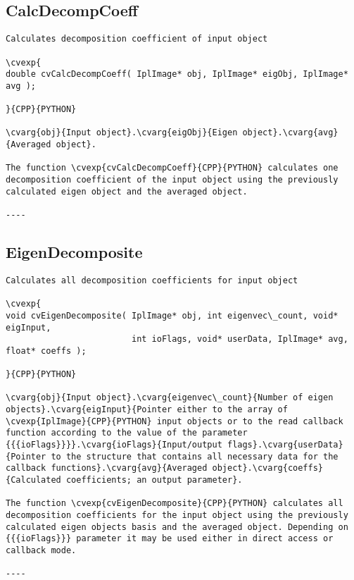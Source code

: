 \subsection{CalcDecompCoeff}
\begin{verbatim}
Calculates decomposition coefficient of input object

\cvexp{
double cvCalcDecompCoeff( IplImage* obj, IplImage* eigObj, IplImage* avg );

}{CPP}{PYTHON}

\cvarg{obj}{Input object}.\cvarg{eigObj}{Eigen object}.\cvarg{avg}{Averaged object}.

The function \cvexp{cvCalcDecompCoeff}{CPP}{PYTHON} calculates one decomposition coefficient of the input object using the previously calculated eigen object and the averaged object.

----
\end{verbatim}
\subsection{EigenDecomposite}
\begin{verbatim}
Calculates all decomposition coefficients for input object

\cvexp{
void cvEigenDecomposite( IplImage* obj, int eigenvec\_count, void* eigInput,
                         int ioFlags, void* userData, IplImage* avg, float* coeffs );

}{CPP}{PYTHON}

\cvarg{obj}{Input object}.\cvarg{eigenvec\_count}{Number of eigen objects}.\cvarg{eigInput}{Pointer either to the array of \cvexp{IplImage}{CPP}{PYTHON} input objects or to the read callback function according to the value of the parameter {{{ioFlags}}}}.\cvarg{ioFlags}{Input/output flags}.\cvarg{userData}{Pointer to the structure that contains all necessary data for the callback functions}.\cvarg{avg}{Averaged object}.\cvarg{coeffs}{Calculated coefficients; an output parameter}.

The function \cvexp{cvEigenDecomposite}{CPP}{PYTHON} calculates all decomposition coefficients for the input object using the previously calculated eigen objects basis and the averaged object. Depending on {{{ioFlags}}} parameter it may be used either in direct access or callback mode.

----
\end{verbatim}
